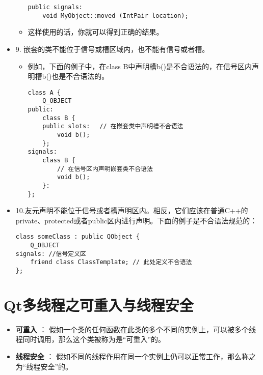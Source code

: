 \documentclass[9pt,b5paper]{article}
\begin{document}
\begin{itemize}
\begin{itemize}
\begin{lstlisting}
public signals:  
    void MyObject::moved (IntPair location);
\end{lstlisting}
\item 这样使用的话，你就可以得到正确的结果。
\end{itemize}
\item 9. 嵌套的类不能位于信号或槽区域内，也不能有信号或者槽。
\begin{itemize}
\item 例如，下面的例子中，在class B中声明槽b()是不合语法的，在信号区内声明槽b()也是不合语法的。
\lstset{language=java,label= ,caption= ,numbers=none}
\begin{lstlisting}
class A {  
    Q_OBJECT  
public:  
    class B {  
	public slots:　 // 在嵌套类中声明槽不合语法  
	    void b();  
    };  
signals:  
    class B {  
	    // 在信号区内声明嵌套类不合语法  
	    void b();  
    }:  
};
\end{lstlisting}
\end{itemize}
\item 10.友元声明不能位于信号或者槽声明区内。相反，它们应该在普通C++的private、protected或者public区内进行声明。下面的例子是不合语法规范的：
\lstset{language=java,label= ,caption= ,numbers=none}
\begin{lstlisting}
class someClass : public QObject {  
    Q_OBJECT  
signals: //信号定义区  
    friend class ClassTemplate; // 此处定义不合语法
};
\end{lstlisting}
\end{itemize}

\section{Qt多线程之可重入与线程安全}
\label{sec-2}
\begin{itemize}
\item \textbf{可重入} ： 假如一个类的任何函数在此类的多个不同的实例上，可以被多个线程同时调用，那么这个类被称为是“可重入”的。
\item \textbf{线程安全} ： 假如不同的线程作用在同一个实例上仍可以正常工作，那么称之为“线程安全”的。
\end{itemize}
\end{document}
